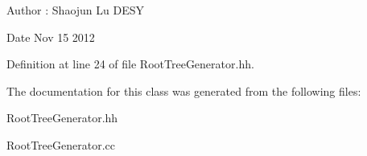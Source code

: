 \begin{DoxyAuthor}{Author}
\-: Shaojun Lu D\-E\-S\-Y 
\end{DoxyAuthor}
\begin{DoxyDate}{Date}
Nov 15 2012 
\end{DoxyDate}


Definition at line 24 of file Root\-Tree\-Generator.\-hh.



The documentation for this class was generated from the following files\-:\begin{DoxyCompactItemize}
\item 
Root\-Tree\-Generator.\-hh\item 
Root\-Tree\-Generator.\-cc\end{DoxyCompactItemize}
